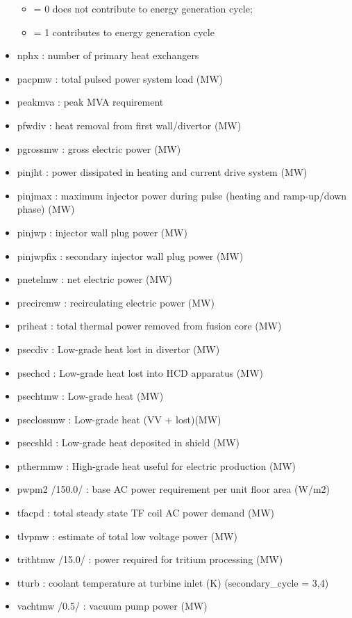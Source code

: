\documentclass[]{article}
\providecommand{\tightlist}{%
  \setlength{\itemsep}{0pt}\setlength{\parskip}{0pt}}
\begin{document}
\begin{itemize}
  \begin{itemize}
  \tightlist
  \item
    = 0 does not contribute to energy generation cycle;
  \item
    = 1 contributes to energy generation cycle
  \end{itemize}
\item
  nphx : number of primary heat exchangers
\item
  pacpmw : total pulsed power system load (MW)
\item
  peakmva : peak MVA requirement
\item
  pfwdiv : heat removal from first wall/divertor (MW)
\item
  pgrossmw : gross electric power (MW)
\item
  pinjht : power dissipated in heating and current drive system (MW)
\item
  pinjmax : maximum injector power during pulse (heating and
  ramp-up/down phase) (MW)
\item
  pinjwp : injector wall plug power (MW)
\item
  pinjwpfix : secondary injector wall plug power (MW)
\item
  pnetelmw : net electric power (MW)
\item
  precircmw : recirculating electric power (MW)
\item
  priheat : total thermal power removed from fusion core (MW)
\item
  psecdiv : Low-grade heat lost in divertor (MW)
\item
  psechcd : Low-grade heat lost into HCD apparatus (MW)
\item
  psechtmw : Low-grade heat (MW)
\item
  pseclossmw : Low-grade heat (VV + lost)(MW)
\item
  psecshld : Low-grade heat deposited in shield (MW)
\item
  pthermmw : High-grade heat useful for electric production (MW)
\item
  pwpm2 /150.0/ : base AC power requirement per unit floor area (W/m2)
\item
  tfacpd : total steady state TF coil AC power demand (MW)
\item
  tlvpmw : estimate of total low voltage power (MW)
\item
  trithtmw /15.0/ : power required for tritium processing (MW)
\item
  tturb : coolant temperature at turbine inlet (K) (secondary\_cycle =
  3,4)
\item
  vachtmw /0.5/ : vacuum pump power (MW)
\end{itemize}
\end{document}

